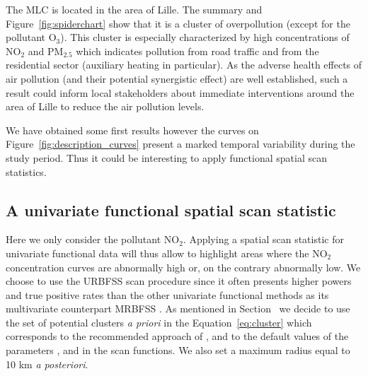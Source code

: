 \noindent The MLC is located in the area of Lille. The summary and Figure~\ref{fig:spiderchart} show that it is a cluster of overpollution (except for the pollutant $\text{O}_3$). %
This cluster is especially characterized by high concentrations of $\text{NO}_2$ and $\text{PM}_{2.5}$ which indicates pollution from road traffic and from the residential sector (auxiliary heating in particular). As the adverse health effects of air pollution (and their potential synergistic effect) are well established, such a result could inform local stakeholders about immediate interventions around the area of Lille to reduce the air pollution levels.

\noindent We have obtained some first results however the curves on Figure~\ref{fig:description_curves} present a marked temporal variability during the study period. Thus it could be interesting to apply functional spatial scan statistics.

\subsection{A univariate functional spatial scan statistic}

Here we only consider the pollutant $\text{NO}_2$. Applying a spatial scan statistic for univariate functional data will thus allow to highlight areas where the $\text{NO}_2$ concentration curves are abnormally high or, on the contrary abnormally low. We choose to use the URBFSS scan procedure since it often presents higher powers and true positive rates than the other univariate functional methods as its multivariate counterpart MRBFSS \citep{notre_fonctionnel1}. As mentioned in Section~ we decide to use the set of potential clusters \textit{a priori} in the Equation~\ref{eq:cluster} which corresponds to the recommended approach of \cite{spatialdisease}, and to the default values of the parameters ,  and  in the scan functions. We also set a maximum radius equal to 10 km \textit{a posteriori}.


